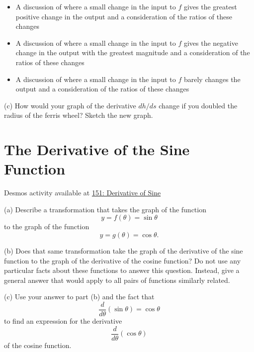 \documentclass{ximera}
\begin{document}
\begin{question}
\begin{itemize}
\item{A discussion of where a small change in the input to $f$ gives the greatest positive change in the output and a consideration of the ratios of these changes }

\item{A discussion of where a small change in the input to $f$ gives the negative change in the output with the greatest magnitude and a consideration of the ratios of these changes }

\item{A discussion of where a small change in the input to $f$ barely changes the output and a consideration of the ratios of these changes }

\end{itemize}

(c) How would your graph of the derivative $dh/ds$ change if you doubled the radius of the ferris wheel? Sketch the new graph.

\begin{onlineOnly}
    \begin{center}
\end{center}
\end{onlineOnly}




\end{question}




\section{The Derivative of the Sine Function}


\begin{question}   \label{Qdgbdgh443}
\begin{onlineOnly}
    \begin{center}
\end{center}
\end{onlineOnly}

Desmos activity available at \href{https://www.desmos.com/calculator/jcmcyrpndw}{151: Derivative of Sine}
\end{question}


\begin{question} \label{Q:gllgbbdd}
(a) Describe a transformation that takes the graph of the function
\[
      y = f(\theta)  = \sin \theta
\]
to the graph of the function 
\[
   y = g(\theta) = \cos\theta.
\]

(b) Does that same transformation take the graph of the derivative of the sine function to the graph of the derivative of the cosine function? Do not use any particular facts about these functions to answer this question. Instead, give a general answer that would apply to all pairs of functions similarly related.

(c) Use your answer to part (b) and the fact that 
\[
      \frac{d}{d\theta} \left(  \sin\theta \right)  = \cos\theta
\]
to find an expression for the derivative
\[
   \frac{d}{d\theta} \left(  \cos\theta \right)
\]
of the cosine function.
\end{question}
\end{document}
